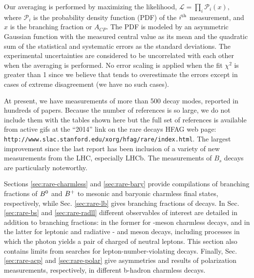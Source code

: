 Our averaging is performed by maximizing the likelihood,
   $\displaystyle {\mathcal L} = \prod_i {\mathcal P}_i(x),$  
where ${\mathcal P_i}$ is the probability density function (PDF) of the
$i^{\rm th}$  measurement, and $x$ is the branching fraction or $A_{CP}$.
The PDF is modeled by an asymmetric Gaussian function with the measured
central value as its mean and the quadratic sum of the statistical
and systematic errors as the standard deviations. The experimental
uncertainties are considered to be uncorrelated with each other when the 
averaging is performed. No error scaling is applied when the fit $\chi^2$ is 
greater than 1 since we believe that tends to overestimate the errors
except in cases of extreme disagreement (we have no such cases).

At present, we have measurements of more than 500 decay modes, reported in
hundreds of 
papers. Because the number of references is so large, we do
not include them with the tables shown here but the full set of
references is available from active gifs at the 
``2014'' link on 
the rare decays HFAG web page: {\tt http://www.slac.stanford.edu/xorg/hfag/rare/index.html}.
The largest improvement since the last report has been inclusion of a
variety of new measurements from the LHC, especially LHCb.  The
measurements of $B_s$ decays are particularly noteworthy.

Sections \ref{sec:rare-charmless} and \ref{sec:rare-bary} provide compilations of branching fractions of $B^0$ and $B^{+}$ to mesonic and baryonic charmless final states, respectively, 
while Sec. \ref{sec:rare-lb} gives branching fractions of \Lb decays.
In Sec. \ref{sec:rare-bs} and \ref{sec:rare-radll} different observables of interest are detailed in addition to branching fractions: in the former for \Bs-meson charmless decays, and in the latter for leptonic and radiative \Bz- and \Bp meson decays, including processes in which the photon yields a pair of charged of neutral leptons. This section also contains limits from searches for lepton-number-violating decays.
Finally, Sec. \ref{sec:rare-acp} and \ref{sec:rare-polar} give \CP asymmetries and results of polarization measurements, respectively, in different b-hadron charmless decays.


